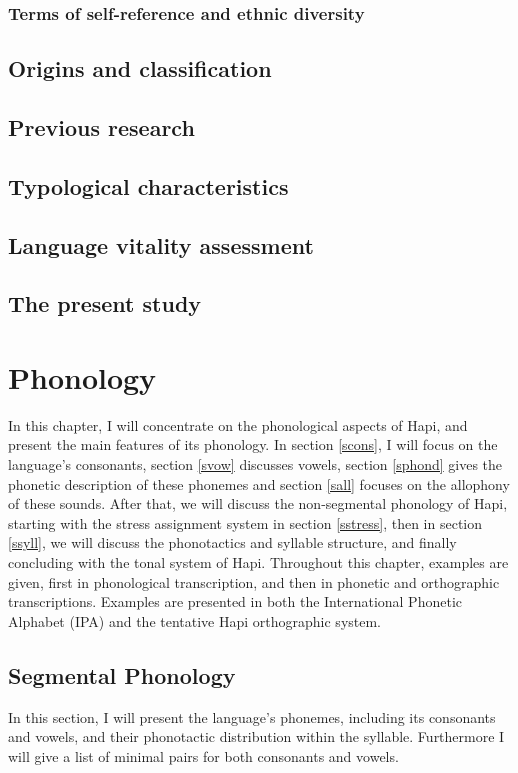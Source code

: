 \documentclass[a4paper, 12pt, oneside]{memoir}
\begin{document}
\subsection{Terms of self-reference and ethnic diversity}
\section{Origins and classification}\label{sorigins}
\section{Previous research}\label{sresearch}
\section{Typological characteristics}\label{stypo}
\section{Language vitality assessment}\label{svitality}
\section{The present study}
\chapter{Phonology}
In this chapter, I will concentrate on the phonological aspects of Hapi, and present the main features of its phonology. In section \ref{scons}, I will focus on the language's consonants, section \ref{svow} discusses vowels, section \ref{sphond} gives the phonetic description of these phonemes and section \ref{sall} focuses on the allophony of these sounds. After that, we will discuss the non-segmental phonology of Hapi, starting with the stress assignment system in section \ref{sstress}, then in section \ref{ssyll}, we will discuss the phonotactics and syllable structure, and finally concluding with the tonal system of Hapi.  Throughout this chapter, examples are given, first in phonological transcription, and then in phonetic and orthographic transcriptions. Examples are presented in both the International Phonetic Alphabet (IPA) and the tentative Hapi orthographic system.
\section{Segmental Phonology}
In this section, I will present the language's phonemes, including its consonants and vowels, and their phonotactic distribution within the syllable. Furthermore I will give a list of minimal pairs for both consonants and vowels.
\end{document}
